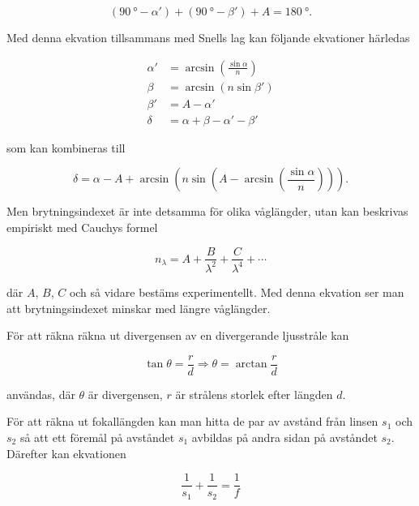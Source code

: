 \documentclass[a4paper]{article}
\begin{document}
  \begin{equation} \label{eq:triSum}
  	(\SI{90}{\degree} - \alpha') + (\SI{90}{\degree} - \beta') + A = \SI{180}{\degree}\text{.}
  \end{equation}
  
  Med denna ekvation tillsammans med Snells lag kan följande ekvationer härledas

  \begin{align} 
  \label{eq:alphaPrim}
  \alpha' &= \arcsin\left(\frac{\sin\alpha}{n}\right)\\
  \label{eq:beta}
  \beta &= \arcsin\left(n \sin\beta'\right)\\
  \label{eq:betaPrim}
  \beta' &= A-\alpha'\\
  \label{eq:delta}
  \delta &= \alpha+\beta-\alpha'-\beta'
  \end{align}
  
  som kan kombineras till

  \begin{equation} \label{eq:avlankning}
  	\delta = \alpha-A+\arcsin\left(n \sin\left(A-\arcsin\left(\frac{\sin\alpha}{n}\right)\right)\right)\text{.}
  \end{equation}
  
  Men brytningsindexet är inte detsamma för olika våglängder, utan kan beskrivas empiriskt med Cauchys formel
  
  \begin{equation} \label{eq:cauchy}
  	n_\lambda = A + \frac{B}{\lambda^2} + \frac{C}{\lambda^4} + \cdots
  \end{equation}
  
  där $A$, $B$, $C$ och så vidare bestäms experimentellt. Med denna ekvation ser man att brytningsindexet minskar med längre våglängder.
  
  För att räkna räkna ut divergensen av en divergerande ljusstråle kan
  
  \begin{equation}
	\tan\theta = \frac{r}{d} \Rightarrow \theta = \arctan\frac{r}{d}\label{eq:divergensGeom}
  \end{equation}
  
  användas, där $\theta$ är divergensen, $r$ är strålens storlek efter längden $d$.
  
  För att räkna ut fokallängden kan man hitta de par av avstånd från linsen $s_1$ och $s_2$ så att ett föremål på avståndet $s_1$ avbildas på andra sidan på avståndet $s_2$. Därefter kan ekvationen
  
  \begin{equation}
	  \frac{1}{s_1} + \frac{1}{s_2} = \frac{1}{f}
  \end{equation}
  
\end{document}

